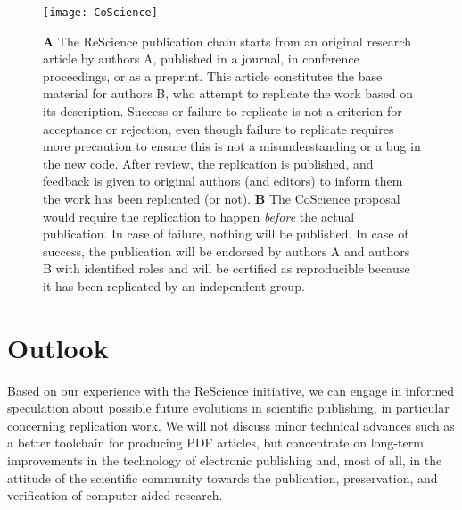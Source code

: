 \documentclass[a4paper,10pt, twocolumn]{article}
\begin{document}
\begin{figure}
  \texttt{[image: CoScience]}
  \caption{\textbf{A} The ReScience publication chain starts from an
    original research article by authors A, published in a journal, in
    conference proceedings, or as a preprint. This article constitutes
    the base material for authors B, who attempt to replicate the work
    based on its description. Success or failure to replicate is not a
    criterion for acceptance or rejection, even though failure to
    replicate requires more precaution to ensure this is not a
    misunderstanding or a bug in the new code. After review, the
    replication is published, and feedback is given to original
    authors (and editors) to inform them the work has been replicated
    (or not). \textbf{B} The CoScience proposal would require the
    replication to happen \textit{before} the actual publication. In
    case of failure, nothing will be published. In case of success,
    the publication will be endorsed by authors A and authors B with
    identified roles and will be certified as reproducible because it
    has been replicated by an independent group.}
  \label{fig:coscience}
\end{figure}

\section*{Outlook}

Based on our experience with the ReScience initiative, we can engage
in informed speculation about possible future evolutions in scientific
publishing, in particular concerning replication work. We will not
discuss minor technical advances such as a better toolchain for
producing PDF articles, but concentrate on long-term improvements in
the technology of electronic publishing and, most of all, in the
attitude of the scientific community towards the publication,
preservation, and verification of computer-aided research.

\end{document}
